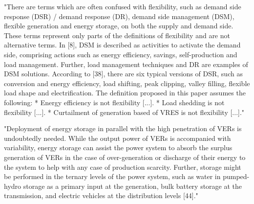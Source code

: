 "There are terms which are often confused with flexibility, such as demand side response (DSR) / demand response (DR), demand side management (DSM), flexible generation and energy storage, on both the supply and demand side. These terms represent only parts of the definitions of flexibility and are not alternative terms. In [8], DSM is described as activities to activate the demand side, comprising actions such as energy efficiency, savings, self-production and load management. Further, load management techniques and DR are examples of DSM solutions. According to [38], there are six typical versions of DSR, such as conversion and energy efficiency, load shifting, peak clipping, valley filling, flexible load shape and electrification. The definition proposed in this paper assumes the following: * Energy efficiency is not flexibility [...]. * Load shedding is not flexibility [...]. * Curtailment of generation based of VRES is not flexibility [...]." \cite{degefa_comprehensive_2021}


"Deployment of energy storage in parallel with the high penetration of VERs is undoubtedly needed. While the output power of VERs is accompanied with variability, energy storage can assist the power system to absorb the surplus generation of VERs in the case of over-generation or discharge of their energy to the system to help with any case of production scarcity. Further, storage might be performed in the ternary levels of the power system, such as water in pumped-hydro storage as a primary input at the generation, bulk battery storage at the transmission, and electric vehicles at the distribution levels [44]." \cite{alireza_akrami_power_2019}

